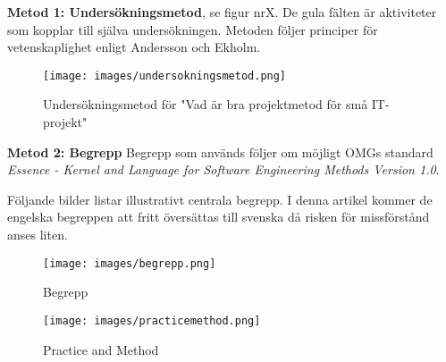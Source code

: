 \textbf{Metod 1: Undersökningsmetod}, se figur nrX. De gula fälten är aktiviteter som 
kopplar till själva undersökningen. Metoden följer principer för vetenskaplighet 
enligt Andersson och Ekholm.
 
\begin{figure}[htbp]
    \centerline{\texttt{[image: images/undersokningsmetod.png]}}
    \caption{Undersökningsmetod för "Vad är bra projektmetod för små IT-projekt"}
    \label{fig}
\end{figure}

\textbf{Metod 2: Begrepp}
Begrepp som används följer om möjligt OMGs standard 
\textit{Essence - Kernel and Language for Software Engineering Methods Version 1.0}.

Följande bilder listar illustrativt centrala begrepp. I denna artikel kommer de engelska
begreppen att fritt översättas till svenska då risken för missförstånd anses liten.

\begin{figure}[htbp]
    \centerline{\texttt{[image: images/begrepp.png]}}
    \caption{Begrepp}
    \label{fig}
\end{figure}

\begin{figure}[htbp]
    \centerline{\texttt{[image: images/practicemethod.png]}}
    \caption{Practice and Method}
    \label{fig}
\end{figure}